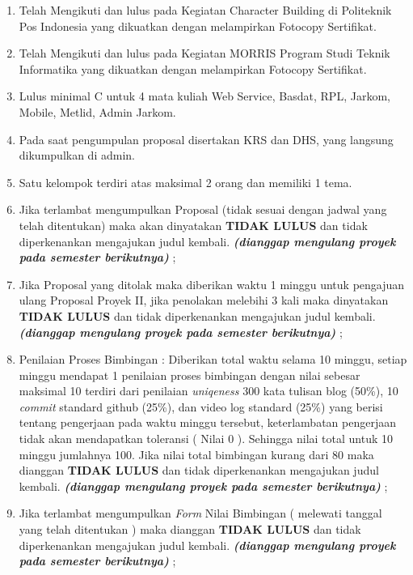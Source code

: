 \begin{enumerate}
	\item Telah	 Mengikuti	 dan	 lulus	 pada	 Kegiatan	 Character	 Building	 di	 Politeknik	 Pos Indonesia yang	dikuatkan	dengan	melampirkan	Fotocopy	Sertifikat.
	
	\item Telah	Mengikuti	 dan	lulus	 pada	 Kegiatan	MORRIS	 Program	 Studi	 Teknik	 Informatika yang dikuatkan	dengan	melampirkan	Fotocopy	Sertifikat.
	
	\item Lulus	minimal	C	untuk	4	mata	kuliah	Web	Service,	Basdat,	RPL, Jarkom, Mobile, Metlid, Admin	Jarkom.
	
	\item Pada	 saat	 pengumpulan	 proposal	 disertakan	 KRS	 dan	 DHS, yang langsung dikumpulkan	di	admin.
	
	\item Satu kelompok terdiri atas maksimal 2 orang dan memiliki 1 tema.
	
	\item Jika terlambat mengumpulkan Proposal (tidak sesuai dengan	jadwal yang telah	ditentukan) maka	 akan	 dinyatakan	\textbf{TIDAK LULUS} dan	 tidak	 diperkenankan	 mengajukan	 judul kembali.	\textit{\textbf{(dianggap mengulang proyek pada semester berikutnya)}} ;
	
	\item Jika Proposal	yang ditolak maka diberikan waktu 1 minggu untuk pengajuan ulang	Proposal	Proyek	II,	jika penolakan	melebihi 3	kali maka dinyatakan	\textbf{TIDAK LULUS} dan tidak	 diperkenankan	 mengajukan judul kembali. \textit{\textbf{(dianggap mengulang proyek pada semester berikutnya)}} ;
	
	\item Penilaian	Proses	Bimbingan	:	Diberikan	total	waktu selama 10 minggu, setiap minggu	mendapat 1 penilaian proses	bimbingan dengan	nilai sebesar maksimal 10 terdiri dari penilaian \textit{ uniqeness} 300	 kata tulisan blog (50\%), 10 \textit{commit} standard github (25\%), dan video log standard (25\%) yang berisi tentang pengerjaan pada waktu minggu tersebut, keterlambatan pengerjaan tidak akan mendapatkan toleransi ( Nilai 0 ). Sehingga nilai total untuk 10 minggu jumlahnya 100. Jika nilai total bimbingan kurang dari 80 maka dianggan \textbf{TIDAK LULUS} dan tidak diperkenankan mengajukan judul kembali. \textit{\textbf{(dianggap mengulang proyek pada semester berikutnya)}} ;
	
	\item Jika terlambat mengumpulkan \textit{Form} Nilai Bimbingan ( melewati tanggal yang telah ditentukan )  maka dianggan \textbf{TIDAK LULUS} dan tidak diperkenankan mengajukan judul kembali. \textit{\textbf{(dianggap mengulang proyek pada semester berikutnya)}} ;
	

\end{enumerate}

